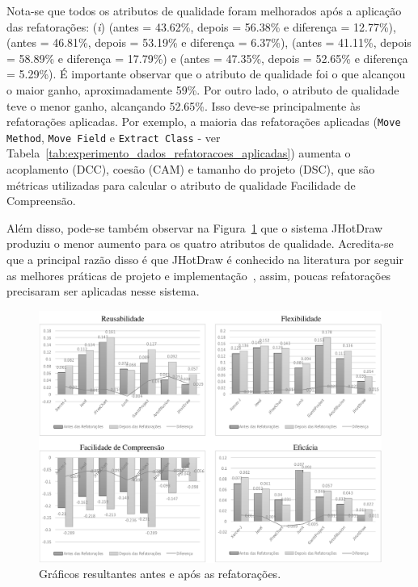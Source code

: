 Nota-se que todos os atributos de qualidade foram melhorados após a aplicação das refatorações: (\textit{i})  (antes = 43.62\%, depois = 56.38\% e diferença = 12.77\%),  (antes = 46.81\%, depois = 53.19\% e diferença = 6.37\%),  (antes = 41.11\%, depois = 58.89\% e diferença = 17.79\%) e  (antes = 47.35\%, depois = 52.65\% e diferença = 5.29\%).
É importante observar que o atributo de qualidade  foi o que alcançou o maior ganho, aproximadamente 59\%. Por outro lado, o atributo de qualidade  teve o menor ganho, alcançando  52.65\%. Isso deve-se principalmente às refatorações aplicadas. Por exemplo, a maioria das refatorações aplicadas (\texttt{Move Method}, \texttt{Move Field} e \texttt{Extract Class}  - ver Tabela~\ref{tab:experimento_dados_refatoracoes_aplicadas}) aumenta o acoplamento (DCC), coesão (CAM) e tamanho do projeto (DSC), que são métricas utilizadas para calcular o atributo de qualidade Facilidade de Compreensão.

Além disso, pode-se também observar na Figura~\ref{fig:barchartRefactoringBeforeAndAfter} que o sistema JHotDraw produziu o menor aumento para os quatro atributos de qualidade. Acredita-se que a principal razão disso é que JHotDraw é conhecido na literatura por seguir as melhores práticas de projeto e implementação~\cite{Kessentini_2010}, assim, poucas refatorações precisaram ser aplicadas nesse sistema.


\begin{figure}[h]
	\centering
	\caption{Gráficos resultantes antes e após as refatorações.}
	\label{fig:barchartRefactoringBeforeAndAfter}
	\includegraphics[scale=0.8]{images/GraficosExperimentoTeseDia080216}
	\fautor
\end{figure}


